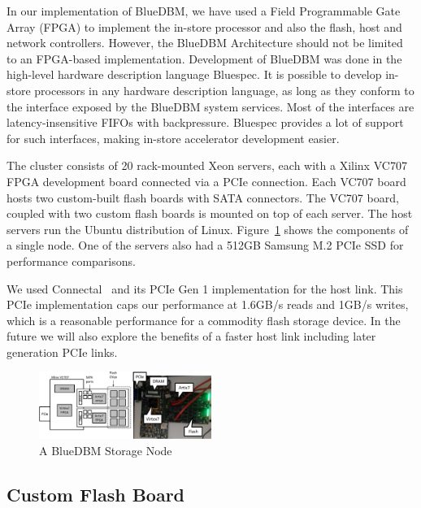 In our implementation of BlueDBM, we have used a Field Programmable Gate
Array (FPGA) to implement the in-store processor and also the flash, host and
network controllers. However, the BlueDBM Architecture should not be limited
to an FPGA-based implementation.  Development of BlueDBM was done in the
high-level hardware description language Bluespec. It is possible to develop in-store processors in any hardware description language, as long as they conform to the interface exposed by the BlueDBM system services. Most of the interfaces are latency-insensitive FIFOs with backpressure. Bluespec provides a lot of support for such interfaces, making in-store accelerator development easier.

The cluster consists of 20 rack-mounted Xeon servers, each with a Xilinx
VC707 FPGA development board connected via a PCIe connection. Each VC707 board
hosts two custom-built flash boards with SATA connectors. The VC707 board,
coupled with two custom flash boards is mounted on top of each server.
The host servers run the Ubuntu distribution of Linux.
Figure~\ref{fig:bluedbmnode} shows the components of a single node.
One of the servers also had a 512GB Samsung M.2 PCIe SSD for performance
comparisons.

We used Connectal~\cite{connectal} and its PCIe Gen 1 implementation for the
host link. This PCIe implementation caps our performance at 1.6GB/s reads and
1GB/s writes, which is a reasonable performance for a commodity flash storage
device. In the future we will also explore the benefits of a faster host link
including later generation PCIe links.

\begin{figure}[ht]
	\begin{center}
	\includegraphics[width=0.5\textwidth]{figures/racknode-crop.pdf}
	\caption{A BlueDBM Storage Node}
	\label{fig:bluedbmnode}
	\end{center}
\end{figure}


\subsection{Custom Flash Board}


